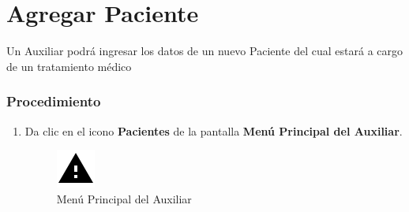 \section{Agregar Paciente}

Un Auxiliar podrá ingresar los datos de un nuevo Paciente del cual
estará a cargo de un tratamiento médico 

\subsubsection{Procedimiento}
\begin{enumerate}
	
	\item Da clic en el icono \textbf{Pacientes} de la pantalla \textbf{Menú Principal del Auxiliar}.

		\begin{figure}[!htbp]			\hypertarget{fig:mpAuxiliar2}{\hspace{1pt}}
		\begin{center}
			\includegraphics[height=0.4\textheight]{images/Iconos/Advertencia}
			\caption{Menú Principal del Auxiliar}
			\label{fig:mpAuxiliar2}
		\end{center}
	\end{figure}


\end{enumerate}
